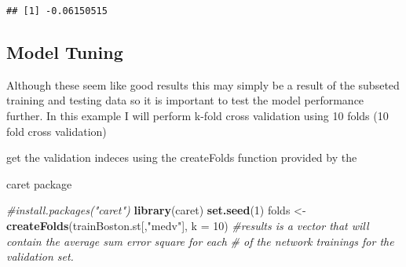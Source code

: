 \documentclass[
]{book}
\newenvironment{Shaded}{\begin{snugshade}}{\end{snugshade}}
\newcommand{\CommentTok}[1]{\textcolor[rgb]{0.56,0.35,0.01}{\textit{#1}}}
\newcommand{\DataTypeTok}[1]{\textcolor[rgb]{0.13,0.29,0.53}{#1}}
\newcommand{\DecValTok}[1]{\textcolor[rgb]{0.00,0.00,0.81}{#1}}
\newcommand{\KeywordTok}[1]{\textcolor[rgb]{0.13,0.29,0.53}{\textbf{#1}}}
\newcommand{\NormalTok}[1]{#1}
\newcommand{\StringTok}[1]{\textcolor[rgb]{0.31,0.60,0.02}{#1}}
\begin{document}
\begin{verbatim}
## [1] -0.06150515
\end{verbatim}

\hypertarget{model-tuning}{%
\subsection{Model Tuning}\label{model-tuning}}

Although these seem like good results this may simply be a result of the
subseted training and testing data so it is important to test the model
performance further. In this example I will perform k-fold cross validation
using 10 folds (10 fold cross validation)

get the validation indeces using the createFolds function provided by the

caret package

\begin{Shaded}
\begin{Highlighting}[]
\CommentTok{#install.packages("caret")}
\KeywordTok{library}\NormalTok{(caret)}
\KeywordTok{set.seed}\NormalTok{(}\DecValTok{1}\NormalTok{)}
\NormalTok{folds <-}\StringTok{ }\KeywordTok{createFolds}\NormalTok{(trainBoston.st[,}\StringTok{"medv"}\NormalTok{], }\DataTypeTok{k =} \DecValTok{10}\NormalTok{)}
\CommentTok{#results is a vector that will contain the average sum error square for each }
\CommentTok{# of the network trainings for the validation set.}
\end{Highlighting}
\end{Shaded}
\end{document}
